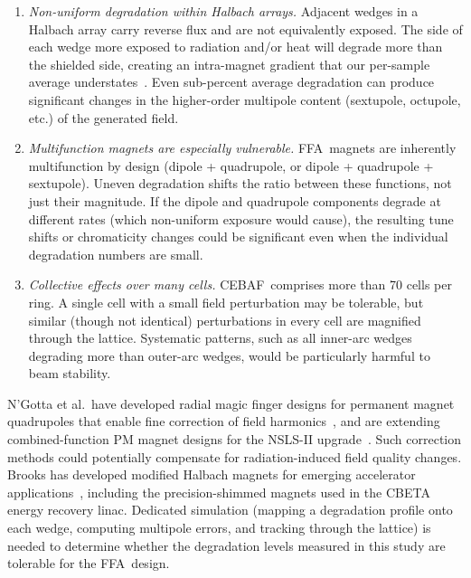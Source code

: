 \documentclass[11pt,letterpaper]{article}
\newcommand{\CEBAF}{CEBAF}
\newcommand{\FFA}{FFA}
\begin{document}
\begin{enumerate}
    \item \emph{Non-uniform degradation within Halbach arrays.}
    Adjacent wedges in a Halbach array carry reverse flux and are not
    equivalently exposed. The side of each wedge more exposed to radiation
    and/or heat will degrade more than the shielded side, creating an
    intra-magnet gradient that our per-sample average
    understates~\cite{Brooks2022_IPAC,Brooks2021_IPAC}. Even sub-percent average
    degradation can produce significant changes in the higher-order
    multipole content (sextupole, octupole, etc.) of the generated field.

    \item \emph{Multifunction magnets are especially vulnerable.}
    \FFA~magnets are inherently multifunction by design (dipole + quadrupole,
    or dipole + quadrupole + sextupole). Uneven degradation shifts the
    ratio between these functions, not just their magnitude. If the
    dipole and quadrupole components degrade at different rates (which
    non-uniform exposure would cause), the resulting tune shifts or
    chromaticity changes could be significant even when the individual
    degradation numbers are small.

    \item \emph{Collective effects over many cells.}
    \FFA@\CEBAF~comprises more than 70 cells per ring. A single cell with a
    small field perturbation may be tolerable, but similar (though not
    identical) perturbations in every cell are magnified through the lattice.
    Systematic patterns, such as all inner-arc wedges degrading more than
    outer-arc wedges, would be particularly harmful to beam stability.
\end{enumerate}

N'Gotta et al.\ have developed radial magic finger designs for permanent magnet
quadrupoles that enable fine correction of field harmonics~\cite{NGotta2025_MEDSI},
and are extending combined-function PM magnet designs for the NSLS-II
upgrade~\cite{NGotta2025_NAPAC}. Such correction methods could potentially
compensate for radiation-induced field quality changes. Brooks has developed
modified Halbach magnets for emerging accelerator
applications~\cite{Brooks2021_IPAC,Brooks2020_PRAB,Brooks2017_IPAC},
including the precision-shimmed magnets used in the CBETA energy recovery linac.
Dedicated simulation (mapping a degradation profile onto each wedge, computing
multipole errors, and tracking through the lattice) is needed to determine
whether the degradation levels measured in this study are tolerable for the
\FFA~design.
\end{document}
